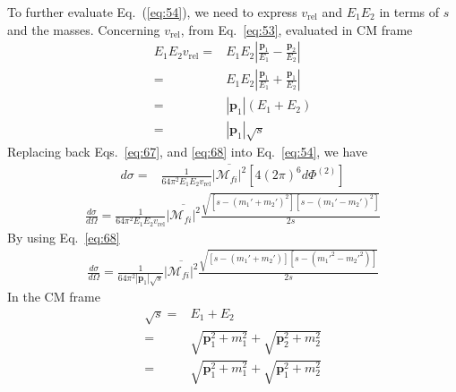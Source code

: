 To further evaluate Eq.~(\ref{eq:54}), we need to express $v_{\text{rel}}$ and $E_1E_2$ in terms of $s$ and the masses. Concerning $v_{\text{rel}}$,
from Eq.~\eqref{eq:53}, evaluated in CM frame
\begin{align}
  \label{eq:68}
    E_1E_2 v_{\text{rel}}=&E_1E_2\left|\frac{\mathbf{p}_1}{E_1}-\frac{\mathbf{p}_2}{E_2}\right|\nonumber\\
  =&E_1E_2\left|\frac{\mathbf{p}_1}{E_1}+\frac{\mathbf{p}_1}{E_2}\right|\nonumber\\
  =&\left|\mathbf{p}_1\right|({E_1+E_2})\nonumber\\
  =&\left|\mathbf{p}_1\right|\sqrt{s}
\end{align}
Replacing back Eqs.~\eqref{eq:67}, and \eqref{eq:68} into Eq.~\eqref{eq:54}, we have
\begin{align}
  \label{eq:69}
      d\sigma=&\frac{1}{64\pi^2E_1E_2v_{\text{rel}}}\overline{\left|\mathcal{M}_{fi}\right|^2}
    \left[4(2\pi)^6d\Phi^{(2)}\right]
\end{align}
\begin{align}
  \frac{d\sigma}{d\Omega}=\frac{1}{64\pi^2E_1E_2v_{\text{rel}}}\overline{\left|\mathcal{M}_{fi}\right|^2}
\frac{\sqrt{[s-({m_1'}+{m_2'})^2][s-({m_1'}-{m_2'})^2]}}{2s}
\end{align}
By using Eq.~\eqref{eq:68}
\begin{align}
  \frac{d\sigma}{d\Omega}=\frac{1}{64\pi^2|\mathbf{p}_1|\sqrt{s}}\overline{\left|\mathcal{M}_{fi}\right|^2}
\frac{\sqrt{[s-({m_1'}+{m_2'})][s-({m_1'}^2-{m_2'}^2)]}}{2s}
\end{align}
In the CM frame
\begin{align}
\sqrt{s}=&E_1+E_2\nonumber\\
=&\sqrt{\mathbf{p}_1^2+m_1^2}+\sqrt{\mathbf{p}_2^2+m_2^2}\nonumber\\
=&\sqrt{\mathbf{p}_1^2+m_1^2}+\sqrt{\mathbf{p}_1^2+m_2^2}
\end{align}

